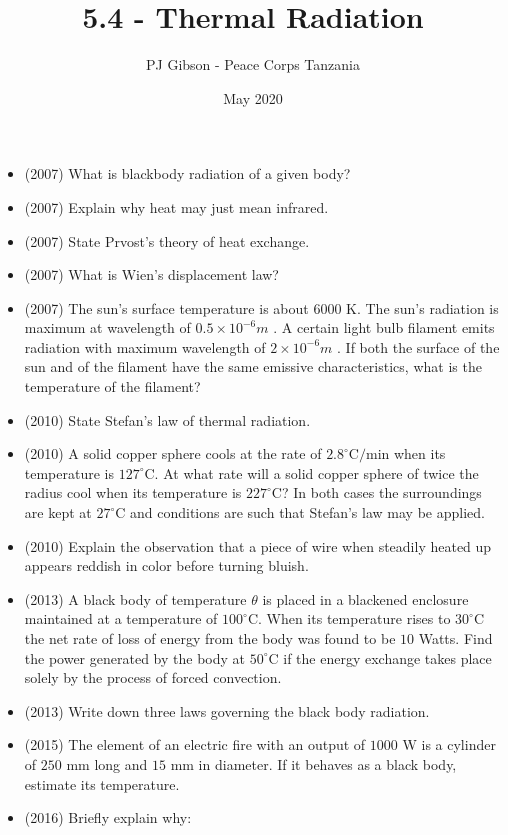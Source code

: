 \documentclass{article}
\title{\textbf{5.4 - Thermal Radiation}}
\author{PJ Gibson - Peace Corps Tanzania}
\date{May 2020}
\begin{document}
\maketitle

\begin{itemize}
\item (2007)  What is blackbody radiation of a given body?
\item (2007)  Explain why heat may just mean infrared.
\item (2007)  State Prvost's theory of heat exchange.
\item (2007)  What is Wien's displacement law?
\item (2007)  The sun's surface temperature is about $ 6000$ K.  The sun's radiation is maximum at wavelength of $ 0.5\times10^{-6}m$ .  A certain light bulb filament emits radiation with maximum wavelength of $ 2\times10^{-6}m$ .  If both the surface of the sun and of the filament have the same emissive characteristics, what is the temperature of the filament?
\item (2010)  State Stefan’s law of thermal radiation.
\item (2010)  A solid copper sphere cools at the rate of $ 2.8^{\circ}$C$/$min when its temperature is $ 127^{\circ}$C. At what rate will a solid copper sphere of twice the radius cool when its temperature is $ 227^{\circ}$C? In both cases the surroundings are kept at $ 27^{\circ}$C and conditions are such that  Stefan’s law may be applied.
\item (2010)  Explain the observation that a piece of wire when steadily heated up appears reddish in color before turning bluish. 
\item (2013)  A black body of temperature $ \theta $ is placed in a blackened enclosure maintained at a temperature of $ 100^{\circ}$C. When its temperature rises to $ 30^{\circ}$C the net rate of loss of energy from the body was found to be $ 10$ Watts. Find the power generated by the body at $ 50^{\circ}$C if the energy exchange takes place solely by the process of forced convection.
\item (2013)  Write down three laws governing the black body radiation.
\item (2015)  The element of an electric fire with an output of $ 1000$ W is a cylinder of $ 250$ mm long and $ 15$ mm in diameter. If it behaves as a black body, estimate its temperature.
\item (2016)  Briefly explain why: 
 \begin{itemize}

\end{itemize}
\end{itemize}
\end{document}
